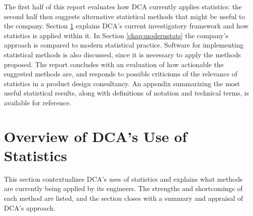 \documentclass[11pt,a4paper,article]{memoir} %
\begin{document}
\par
The first half of this report evaluates how DCA currently applies statistics: the second half then suggests alternative statistical methods that might be useful to the company. Section \ref{chap:dca} explains DCA's current investigatory framework and how statistics is applied within it. In Section \ref{chap:modernstats} the company's approach is compared to modern statistical practice. Software for implementing statistical methods is also discussed, since it is necessary to apply the methods proposed. The report concludes with an evaluation of how actionable the suggested methods are, and responds to possible criticisms of the relevance of statistics in a product design consultancy. An appendix summarizing the most useful statistical results, along with definitions of notation and technical terms, is available for reference.

\newpage



\chapter {Overview of DCA's Use of Statistics}
\label{chap:dca}
This section contextualizes DCA's uses of statistics and explains what methods are currently being applied by its engineers. The strengths and shortcomings of each method are listed, and the section closes with a summary and appraisal of DCA's approach.
\end{document}
